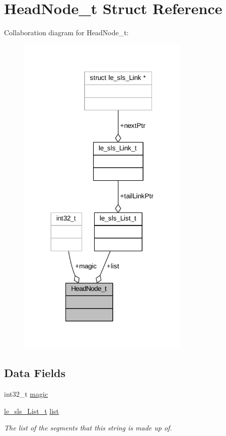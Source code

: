 \hypertarget{struct_head_node__t}{}\section{Head\+Node\+\_\+t Struct Reference}
\label{struct_head_node__t}


Collaboration diagram for Head\+Node\+\_\+t\+:
\nopagebreak
\begin{figure}[H]
\begin{center}
\leavevmode
\includegraphics[width=233pt]{struct_head_node__t__coll__graph}
\end{center}
\end{figure}
\subsection*{Data Fields}
\begin{DoxyCompactItemize}
\item 
int32\+\_\+t \hyperlink{struct_head_node__t_a6a65dec1ea5d772b10a28fc5e082a61f}{magic}
\item 
\hyperlink{structle__sls___list__t}{le\+\_\+sls\+\_\+\+List\+\_\+t} \hyperlink{struct_head_node__t_a93a2c8ba2626a4bd5e6f41b5010a7839}{list}
\begin{DoxyCompactList}\small\item\em The list of the segments that this string is made up of. \end{DoxyCompactList}\end{DoxyCompactItemize}


